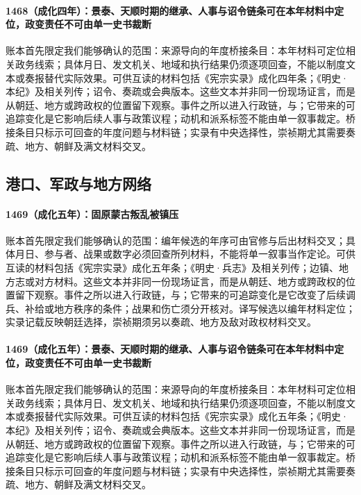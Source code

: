 \paragraph{1468（成化四年）：景泰、天顺时期的继承、人事与诏令链条可在本年材料中定位，政变责任不可由单一史书裁断} 账本首先限定我们能够确认的范围：来源导向的年度桥接条目：本年材料可定位相关政务线索；具体月日、发文机关、地域和执行结果仍须逐项回查，不能以制度文本或奏报替代实际效果。可供互读的材料包括《宪宗实录》成化四年条；《明史·本纪》及相关列传；诏令、奏疏或会典版本。这些文本并非同一份现场证言，而是从朝廷、地方或跨政权的位置留下观察。事件之所以进入行政链，与；它带来的可追踪变化是它影响后续人事与政策议程；动机和派系标签不能由单一叙事裁定。桥接条目只标示可回查的年度问题与材料链；实录有中央选择性，崇祯期尤其需要奏疏、地方、朝鲜及满文材料交叉。

\subsection{港口、军政与地方网络}

\paragraph{1469（成化五年）：固原蒙古叛乱被镇压} 账本首先限定我们能够确认的范围：编年候选的年序可由官修与后出材料交叉；具体月日、参与者、战果或数字必须回查所列材料，不能将单一叙事当作定论。可供互读的材料包括《宪宗实录》成化五年条；《明史·兵志》及相关列传；边镇、地方志或对方材料。这些文本并非同一份现场证言，而是从朝廷、地方或跨政权的位置留下观察。事件之所以进入行政链，与；它带来的可追踪变化是它改变了后续调兵、补给或地方秩序的条件；战果和伤亡须分开核对。译写候选以编年材料定位；实录记载反映朝廷选择，崇祯期须另以奏疏、地方及敌对政权材料交叉。

\paragraph{1469（成化五年）：景泰、天顺时期的继承、人事与诏令链条可在本年材料中定位，政变责任不可由单一史书裁断} 账本首先限定我们能够确认的范围：来源导向的年度桥接条目：本年材料可定位相关政务线索；具体月日、发文机关、地域和执行结果仍须逐项回查，不能以制度文本或奏报替代实际效果。可供互读的材料包括《宪宗实录》成化五年条；《明史·本纪》及相关列传；诏令、奏疏或会典版本。这些文本并非同一份现场证言，而是从朝廷、地方或跨政权的位置留下观察。事件之所以进入行政链，与；它带来的可追踪变化是它影响后续人事与政策议程；动机和派系标签不能由单一叙事裁定。桥接条目只标示可回查的年度问题与材料链；实录有中央选择性，崇祯期尤其需要奏疏、地方、朝鲜及满文材料交叉。

